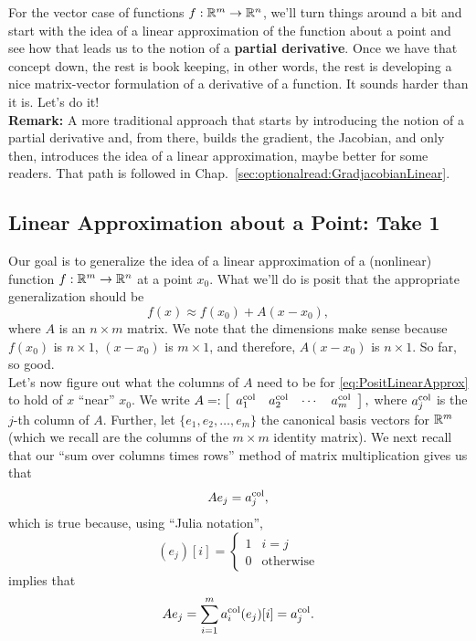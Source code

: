For the vector case of functions $f:\mathbb R^m \to \mathbb R^n$, we'll turn things around a bit and start with the idea of a linear approximation of the function about a point and see how that leads us to the notion of a \textbf{partial derivative}. Once we have that concept down, the rest is book keeping, in other words, the rest is developing a nice matrix-vector formulation of a derivative of a function. It sounds harder than it is. Let's do it! \\

\textbf{Remark:} A more traditional approach that starts by introducing the notion of a partial derivative and, from there, builds the gradient, the Jacobian, and only then, introduces the idea of a linear approximation, maybe better for some readers. That path is followed in Chap.~\ref{sec:optionalread:GradjacobianLinear}.

\subsection{Linear Approximation about a Point: Take 1}

 Our goal is to generalize the idea of a linear approximation of a (nonlinear) function $f:\mathbb R^m \to \mathbb R^n $ at a point $x_0$. What we'll do is posit that the appropriate generalization should be 
 \begin{equation}
     \label{eq:PositLinearApprox}
     f(x) \approx f(x_0) + A ( x - x_0),
 \end{equation}
 where $A$ is an $n \times m$ matrix. We note that the dimensions make sense because $f(x_0)$ is $n \times 1$, $( x - x_0)$ is $m \times 1$, and therefore, $A ( x - x_0)$ is $n \times 1$. So far, so good.  \\
 
 Let's now figure out what the columns of $A$ need to be for \eqref{eq:PositLinearApprox} to hold of $x$ ``near'' $x_0$. We write $A=:\left[\begin{array}{cccc} a_1^{\rm col} & a_2^{\rm col} & \cdots & a_m^{\rm col}\end{array}\right],$ where  $a_j^{\rm col}$ is the $j$-th column of $A$. Further, let $\{ e_1, e_2, \ldots, e_m\}$ the canonical basis vectors for $\mathbb R^m$ (which we recall are the columns of the $m \times m$ identity matrix). We next recall that our ``sum over columns times rows'' method of matrix multiplication gives us that 
 $$ A e_j =  a_j^{\rm col}, $$ 
 which is true because, using ``Julia notation'', 
 $$(e_j)[i] = \begin{cases} 1 & i = j \\ 0 & \text{otherwise} \end{cases} $$
 implies that 
 $$ A e_j = \sum_{i=1}^m a_i^{\rm col}(e_j)[i] = a_j^{\rm col}.$$
 
